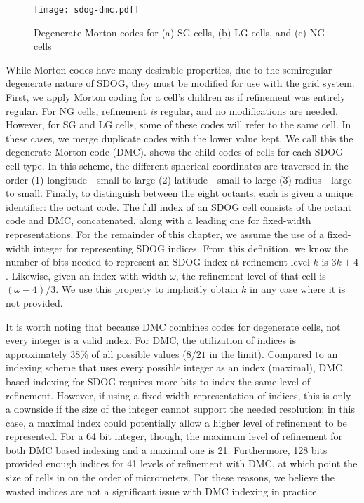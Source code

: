 \begin{figure}[ht!]
	\centering
	\texttt{[image: sdog-dmc.pdf]}
	\caption[Degenerate Morton codes for the different SDOG cell types]{
		Degenerate Morton codes for (a) SG cells, (b) LG cells, and (c) NG cells
	}
	\label{fig:sdog-dmc}
\end{figure}


While Morton codes have many desirable properties, due to the semiregular degenerate nature of SDOG, they must be modified for use with the grid system.
First, we apply Morton coding for a cell's children as if refinement was entirely regular.
For NG cells, refinement \textit{is} regular, and no modifications are needed.
However, for SG and LG cells, some of these codes will refer to the same cell.
In these cases, we merge duplicate codes with the lower value kept.
We call this the degenerate Morton code (DMC).
 shows the child codes of cells for each SDOG cell type.
In this scheme, the different spherical coordinates are traversed in the order (1) longitude---small to large (2) latitude---small to large (3) radius---large to small.
Finally, to distinguish between the eight octants, each is given a unique identifier: the octant code.
The full index of an SDOG cell consists of the octant code and DMC, concatenated, along with a leading one for fixed-width representations.
For the remainder of this chapter, we assume the use of a fixed-width integer for representing SDOG indices.
From this definition, we know the number of bits needed to represent an SDOG index at refinement level $k$ is $3k + 4$.
Likewise, given an index with width $\omega$, the refinement level of that cell is $(\omega - 4) / 3$.
We use this property to implicitly obtain $k$ in any case where it is not provided.


It is worth noting that because DMC combines codes for degenerate cells, not every integer is a valid index.
For DMC, the utilization of indices is approximately 38\% of all possible values ($8/21$ in the limit).
Compared to an indexing scheme that uses every possible integer as an index (maximal), DMC based indexing for SDOG requires more bits to index the same level of refinement.
However, if using a fixed width representation of indices, this is only a downside if the size of the integer cannot support the needed resolution; in this case, a maximal index could potentially allow a higher level of refinement to be represented.
For a 64 bit integer, though, the maximum level of refinement for both DMC based indexing and a maximal one is 21.
Furthermore, 128 bits provided enough indices for 41 levels of refinement with DMC, at which point the size of cells in on the order of micrometers.
For these reasons, we believe the wasted indices are not a significant issue with DMC indexing in practice.


